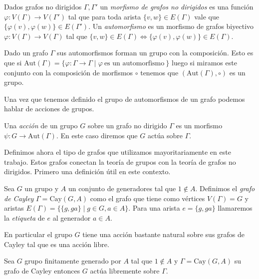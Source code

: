 \documentclass[tesis.tex]{subfiles}
\begin{document}
\begin{deff}
	Dados grafos no dirigidos $\Gamma, \Gamma'$ un \emph{morfismo de grafos no dirigidos} es una función $\varphi:V(\Gamma) \to V(\Gamma')$ tal que para toda arista $\{ v,w \} \in E(\Gamma)$ vale que $\{  \varphi(v), \varphi(w) \} \in E(\Gamma')$.
	Un \emph{automorfismo} es un morfismo de grafos biyectivo $\varphi: V(\Gamma) \to V(\Gamma)$ tal que 
	$\{ v,w \} \in E(\Gamma) \iff \{ \varphi(v), \varphi(w) \} \in E(\Gamma)$. 
\end{deff}

Dado un grafo $\Gamma$ sus automorfismos forman un grupo con la composición.
Esto es que si $\text{Aut}(\Gamma) = \{ \varphi: \Gamma \to \Gamma  \mid \varphi \ \text{es un automorfismo} \  \}$ luego si miramos este conjunto con la composición de morfismos $\circ$ tenemos que $(\text{Aut}(\Gamma), \circ)$ es un grupo.

Una vez que tenemos definido el grupo de automorfismos de un grafo podemos hablar de acciones de grupos.

\begin{deff}
	Una \emph{acción} de un grupo $G$ sobre un grafo no dirigido $\Gamma$ es un morfismo $\psi:G \to \text{Aut}(\Gamma)$.
	En este caso diremos que $G$ actúa sobre $\Gamma$.
\end{deff}




Definimos ahora el tipo de grafos que utilizamos mayoritariamente en este trabajo.
Estos grafos conectan la teoría de grupos con la teoría de grafos no dirigidos.
Primero una definición útil en este contexto.


\begin{deff}
	Sea $G$ un grupo y $A$ un conjunto de generadores tal que $1 \notin A$.
	Definimos el \emph{grafo de Cayley} $\Gamma = \text{Cay}(G,A)$ como el grafo que tiene como vértices $V(\Gamma) = G$ y aristas $E(\Gamma) = \{ \{g,ga \} \mid g \in G, a \in A \}$.
	Para una arista $e = \{g,ga\}$ llamaremos la \emph{etiqueta} de $e$ al generador $a \in A$.
\end{deff}


En particular el grupo $G$ tiene una acción bastante natural sobre sus grafos de Cayley tal que es una acción libre.

\begin{lema}\label{lema_grp_acc_libre_cayley}
	Sea $G$ grupo finitamente generado por $A$ tal que $1 \notin A$ y $\Gamma = \text{Cay}(G,A)$ su grafo de Cayley entonces $G$ actúa libremente sobre $\Gamma$.
\end{lema}
\end{document}

